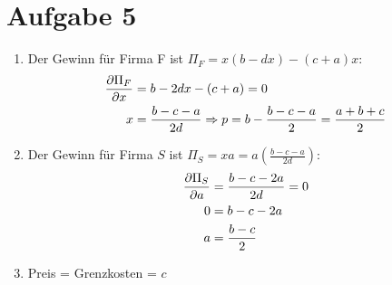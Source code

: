 \documentclass{article}
\begin{document}
	\section*{Aufgabe 5}
	\begin{enumerate}[label=(\alph*)]
		\item Der Gewinn für Firma F ist $\Pi_F=x(b-dx) - (c+a)x$:
		\begin{align}
			\frac{\partial \Pi_F}{\partial x} &= b-2dx - (c+a) = 0 \notag \\
			x &= \frac{b-c-a}{2d} \Rightarrow p = b-\frac{b-c-a}{2}=\frac{a+b+c}{2} \notag
		\end{align}
		\item Der Gewinn für Firma $S$ ist $\Pi_S=xa = a\left(\frac{b-c-a}{2d}\right)$:
		\begin{align}
			\frac{\partial \Pi_S}{\partial a} &= \frac{b-c-2a}{2d} = 0 \notag \\
			0 &= b-c-2a \notag \\
			a &= \frac{b-c}{2} \notag
		\end{align}
		\item Preis = Grenzkosten = $c$
	\end{enumerate}
	
\end{document}

